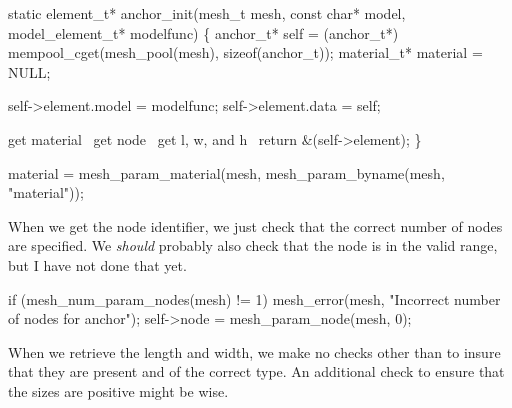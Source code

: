 \nwendcode{}\nwdocspar

\nwenddocs{}\endmoddef
static element_t* anchor_init(mesh_t mesh, const char* model,
                              model_element_t* modelfunc)
\{
    anchor_t* self = (anchor_t*) 
        mempool_cget(mesh_pool(mesh), sizeof(anchor_t));
    material_t* material = NULL;

    self->element.model = modelfunc;
    self->element.data = self;

    \LA{}get material~{\nwtagstyle{}}\RA{}
    \LA{}get \code{}node\edoc{}~{\nwtagstyle{}}\RA{}
    \LA{}get \code{}l\edoc{}, \code{}w\edoc{}, and \code{}h\edoc{}~{\nwtagstyle{}}\RA{}
    return &(self->element);
\}

\nwendcode{}\nwdocspar

\nwenddocs{}\endmoddef
material = mesh_param_material(mesh, mesh_param_byname(mesh, "material"));
\nwendcode{}\nwdocspar

When we get the node identifier, we just check that the correct
number of nodes are specified.  We \emph{should} probably also
check that the node is in the valid range, but I have not done
that yet.

\nwenddocs{}\endmoddef
if (mesh_num_param_nodes(mesh) != 1)
    mesh_error(mesh, "Incorrect number of nodes for anchor");
self->node = mesh_param_node(mesh, 0);

\nwendcode{}\nwdocspar

When we retrieve the length and width, we make no checks other
than to insure that they are present and of the correct type.
An additional check to ensure that the sizes are positive might
be wise.

